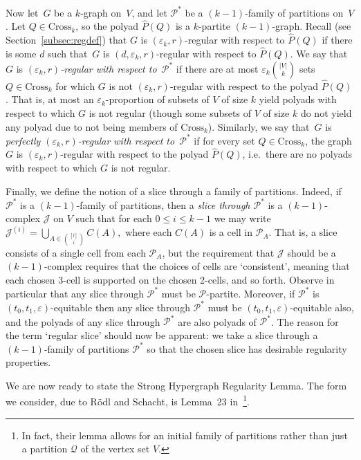 \documentclass[12pt,a4paper]{amsart}
\let\eps\varepsilon
\newcommand{\cJ}{\mathcal{J}}
\newcommand{\Part}{\mathcal{P}}
\newcommand{\Qart}{\mathcal{Q}}
\newcommand{\cross}{\textrm{Cross}}
\begin{document}
Now let~$G$ be a $k$-graph on~$V$, and let $\Part^*$ be a $(k-1)$-family of
partitions on~$V$. Let $Q\in\cross_k$, so the polyad $\hat{P}(Q)$ is a $k$-partite $(k-1)$-graph. Recall
(see Section~\ref{subsec:regdef}) that $G$ is $(\eps_k,r)$-regular
with respect to $\hat{P}(Q)$ if there is some $d$ such that~$G$ is
$(d,\eps_k,r)$-regular with respect to $\hat{P}(Q)$. 
We say that~$G$
is \emph{$(\eps_k,r)$-regular with respect to~$\Part^*$} if there are at most
$\eps_k \binom{|V|}{k}$ sets $Q \in \cross_k$ for which $G$ is not
$(\eps_k,r)$-regular with respect to the polyad $\hat{P}(Q)$. That is,
at most an $\eps_k$-proportion of subsets of $V$ of size $k$ yield polyads with respect to which $G$ is not regular (though some subsets of $V$ of size $k$ do
not yield any polyad due to not being members of $\cross_k$). Similarly, we say that~$G$
is \emph{perfectly $(\eps_k,r)$-regular with respect to~$\Part^*$} if for every
set $Q \in \cross_k$, the graph $G$ is $(\eps_k,r)$-regular with respect to the
polyad $\hat{P}(Q)$, i.e.~there are no polyads with respect to which
$G$ is not regular.

Finally, we define the notion of a slice through a family of partitions. Indeed, 
if $\Part^*$ is a $(k-1)$-family of partitions, then a \emph{slice through $\Part^*$} 
is a $(k-1)$-complex $\cJ$ on $V$ such that for each $0 \leq i \leq k-1$ we may write
$\cJ^{(i)} = \bigcup_{A \in \binom{[t]}{i}} C(A),$
where each $C(A)$ is a cell in $\Part_A$. That is, a slice consists of a single cell 
from each $\Part_A$, but the requirement that $\cJ$ should be a $(k-1)$-complex requires that 
the choices of cells are `consistent', meaning that each chosen 3-cell is supported 
on the chosen 2-cells, and so forth. Observe in particular that any slice through 
$\Part^*$ must be $\Part$-partite. Moreover, if $\Part^*$ is 
$(t_0, t_1, \eps)$-equitable then any slice through $\Part^*$ must be 
$(t_0, t_1, \eps)$-equitable also, and the polyads of any slice through $\Part^*$ are also polyads of $\Part^*$. The reason for the term `regular slice' should 
now be apparent: we take a slice through a $(k-1)$-family of partitions $\Part^*$ 
so that the chosen slice has desirable regularity properties. 

We are now ready to state the Strong Hypergraph Regularity Lemma. The form
we consider, due to R\"odl and Schacht, is Lemma~23 in~\cite{RS}\footnote{In fact, their lemma allows for an initial family of partitions rather than just a partition $\Qart$ of the vertex set $V$.}.
\end{document}

